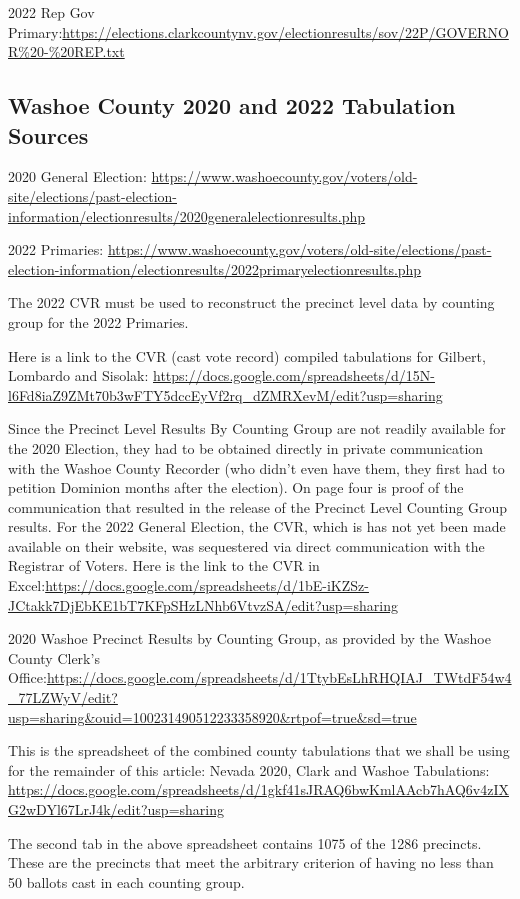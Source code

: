 2022 Rep  Gov Primary:\url{https://elections.clarkcountynv.gov/electionresults/sov/22P/GOVERNOR%20-%20REP.txt}

\subsection{Washoe County 2020 and 2022 Tabulation Sources}
2020 General Election: \url{https://www.washoecounty.gov/voters/old-site/elections/past-election-information/electionresults/2020generalelectionresults.php}

2022 Primaries: \url{https://www.washoecounty.gov/voters/old-site/elections/past-election-information/electionresults/2022primaryelectionresults.php}

The 2022 CVR must be used to reconstruct the precinct level data by counting group for the 2022 Primaries.

Here is a link to the CVR (cast vote record) compiled tabulations for Gilbert, Lombardo and Sisolak: \url{https://docs.google.com/spreadsheets/d/15N-l6Fd8iaZ9ZMt70b3wFTY5dccEyVf2rq_dZMRXevM/edit?usp=sharing}

Since the Precinct Level Results By Counting Group are not readily available for the 2020 Election, they had to be obtained directly in private communication with the Washoe
County Recorder (who didn't even have them, they first had to petition Dominion months after the election). On page four is proof of the communication that resulted in the release of the Precinct Level Counting Group results. 
\newpage
For the 2022 General Election, the CVR, which is has not yet been made available on their website, was sequestered via direct communication with the Registrar of Voters. Here is 
the link to the CVR in Excel:\url{https://docs.google.com/spreadsheets/d/1bE-iKZSz-JCtakk7DjEbKE1bT7KFpSHzLNhb6VtvzSA/edit?usp=sharing}

2020 Washoe Precinct Results by Counting Group, as provided by the Washoe County Clerk’s Office:\url{https://docs.google.com/spreadsheets/d/1TtybEsLhRHQIAJ_TWtdF54w4_77LZWyV/edit?usp=sharing&ouid=100231490512233358920&rtpof=true&sd=true}

This is the spreadsheet of the combined county tabulations that we shall be using for the remainder of this article: Nevada 2020, Clark and Washoe Tabulations:\\ \url{https://docs.google.com/spreadsheets/d/1gkf41sJRAQ6bwKmlAAcb7hAQ6v4zIXG2wDYl67LrJ4k/edit?usp=sharing}

 The second tab in the above spreadsheet contains 1075 of the 1286 precincts. These are the precincts that meet the arbitrary criterion of having no less than 50 ballots cast in each counting group.
 
